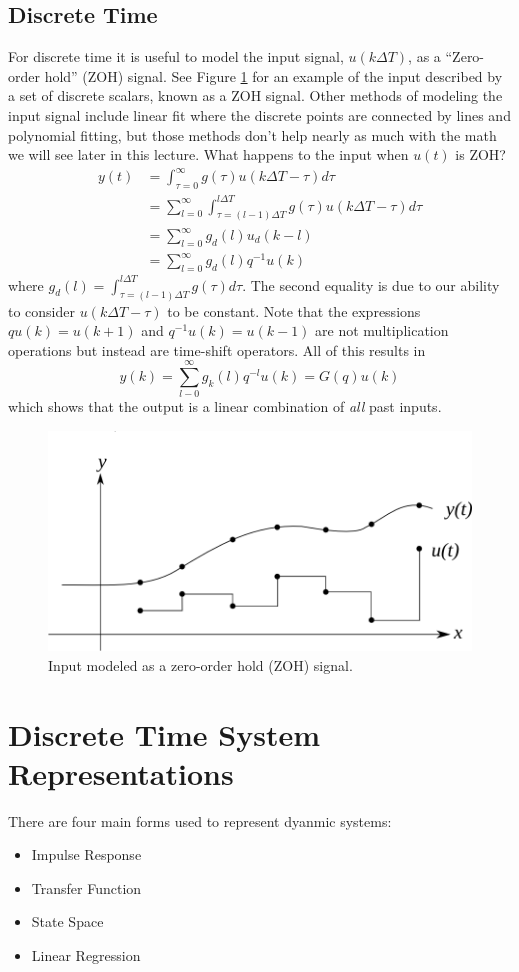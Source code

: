 \documentclass[lecture,12pt,]{pcms-l}
\theoremstyle{example}
\newcommand{\tauint}{\int_{\tau=0}^\infty}
\newcommand{\dt}{\Delta T}
\begin{document}
\subsection{Discrete Time}
For discrete time it is useful to model the input signal, $u(k\Delta T)$, as a ``Zero-order hold'' (ZOH) signal. See Figure \ref{fig:03zoh} for an example of the input described by a set of discrete scalars, known as a ZOH signal. Other methods of modeling the input signal include linear fit where the discrete points are connected by lines and polynomial fitting, but those methods don't help nearly as much with the math we will see later in this lecture. What happens to the input when $u(t)$ is ZOH?
\begin{align*}
y(t) &= \tauint g(\tau)u(k\dt -\tau)d\tau \\
&= \sum_{l=0}^\infty \int_{\tau=(l-1)\dt}^{l\dt}g(\tau)u(k\dt -\tau)d\tau \\
&= \sum_{l=0}^\infty g_d(l)u_d(k-l) \\
&= \sum_{l=0}^\infty g_d(l)q^{-1}u(k)
\end{align*}
where $g_d(l)=\int_{\tau=(l-1)\dt}^{l\dt}g(\tau)d\tau$. The second equality is due to our ability to consider $u(k\dt -\tau)$ to be constant. Note that the expressions $qu(k) = u(k+1)$ and $q^{-1}u(k)=u(k-1)$ are not multiplication operations but instead are time-shift operators. All of this results in
$$y(k) = \sum_{l-0}^\infty g_k(l)q^{-l}u(k) = G(q)u(k)$$
which shows that the output is a linear combination of \textit{all} past inputs.
\begin{figure}[ht!]
	\centering
	\includegraphics[width=.5\textwidth]{images/03zoh}
	\caption{Input modeled as a zero-order hold (ZOH) signal.}
	\label{fig:03zoh}
\end{figure}

\section{Discrete Time System Representations}
There are four main forms used to represent dyanmic systems:
\begin{itemize}
\item Impulse Response
\item Transfer Function
\item State Space
\item Linear Regression
\end{itemize}
\end{document}
